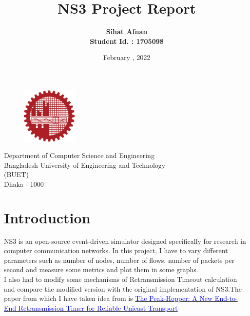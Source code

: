 \documentclass{article}[12pt]
\title{\Huge{NS3 Project Report}}
\author{\textbf{Sihat Afnan} \\
        \textbf{Student Id. : 1705098} 
     }
\date{\large February , 2022}
\begin{document}
\maketitle

\vspace{4cm}

\begin{figure}[h!]
\centering
    \includegraphics[width = 0.25\textwidth]{Pictures/logoBUET.png}
\end{figure}
\begin{center}
\vspace{.5cm}

\Large{Department of Computer Science and Engineering \\
    Bangladesh University of Engineering and Technology \\
    (BUET) \\
    Dhaka - 1000 }

\end{center}
\newpage

\tableofcontents
\newpage

\listoffigures
\newpage

\section{Introduction}
    NS3 is an open-source event-driven simulator designed specifically for research in computer communication networks. In this project, I have to vary different parameters such as number of nodes, number of flows, number of packets per second and measure some metrics and plot them in some graphs. \\
    I also had to modify some mechanisms of Retransmission Timeout calculation and compare the modified version with the original implementation of NS3.The paper from which I have taken idea from is
    \begingroup
    \hypersetup{hidelinks}
    \href{http://citeseerx.ist.psu.edu/viewdoc/download?doi=10.1.1.76.2748&rep=rep1&type=pdf}{\textcolor{blue}{The Peak-Hopper: A New End-to-End
    	Retransmission Timer for Reliable Unicast Transport} }
    \endgroup 
    
  
    
\end{document}
